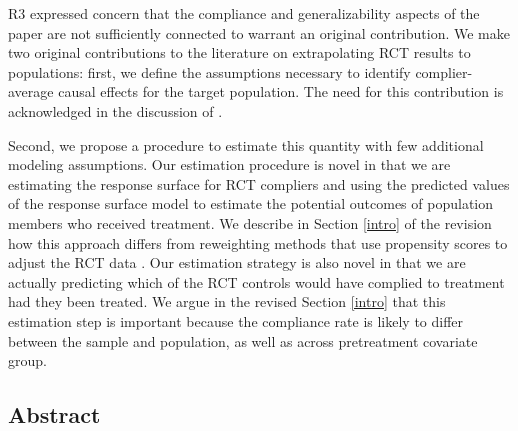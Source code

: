 \documentclass[hidelinks,12pt,letterpaper]{article}
\begin{document}

R3 expressed concern that the compliance and generalizability aspects of the paper are not sufficiently connected to warrant an original contribution. We make two original contributions to the literature on extrapolating RCT results to populations: first, we define the assumptions necessary to identify complier-average causal effects for the target population. The need for this contribution is acknowledged in the discussion of \citet{Hartman}. 

Second, we propose a procedure to estimate this quantity with few additional modeling assumptions. Our estimation procedure is novel in that we are estimating the response surface for RCT compliers and using the predicted values of the response surface model to estimate the potential outcomes of population members who received treatment. We describe in Section \ref{intro} of the revision how this approach differs from reweighting methods that use propensity scores to adjust the RCT data \citep[e.g.,][]{stuart2011use}. Our estimation strategy is also novel in that we are actually predicting which of the RCT controls would have complied to treatment had they been treated. We argue in the revised Section \ref{intro} that this estimation step is important because the compliance rate is likely to differ between the sample and population, as well as across pretreatment covariate group. 


\subsection{Abstract}

\end{document}
